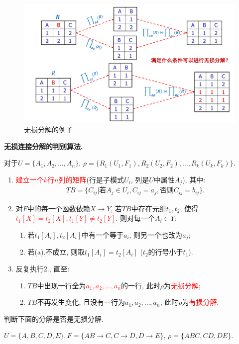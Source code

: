 \begin{figure}[H]
    \centering
    \includegraphics[width=.6\textwidth]{./figure/无损分解.pdf}
    \caption{无损分解的例子}
\end{figure}

\textbf{无损连接分解的判别算法.}

对于$U=\{A_1,A_2,\dots,A_n\}$, $\rho=\{R_1(U_1,F_1),R_2(U_2,F_2),\dots,R_k(U_k,F_k)\}$.
\begin{enumerate}
    \item \textcolor{red}{建立一个$k$行$n$列的矩阵}(行是子模式$U_i$, 列是$U$中属性$A_j$), 其中:
    \begin{align*}
      TB = \{C_{ij} | \text{若}A_j\in U_i, C_{ij}=a_j, \text{否则}C_{ij}=b_{ij}\}.
    \end{align*}
    \item 对$F$中的每一个函数依赖$X\to Y$, 若$TB$中存在元组$t_1,t_2$, 使得\textcolor{red}{$t_1[X]=t_2[X], t_1[Y]\neq t_2[Y]$}. 则对每一个$A_i\in Y$:
    \begin{enumerate}
        \item 若$t_1[A_i],t_2[A_i]$中有一个等于$a_i$, 则另一个也改为$a_j$;
        \item 若(a).不成立, 则取$t_1[A_i]=t_2[A_i]$ ($t_2$的行号小于$t_1$).
    \end{enumerate}
    \item 反复执行2., 直至:
    \begin{enumerate}
        \item $TB$中出现一行全为\textcolor{red}{$a_1,a_2,\dots,a_n$}的一行, 此时$\rho$为\textcolor{red}{无损分解};
        \item $TB$不再发生变化, 且没有一行为$a_1,a_2,\dots,a_n$, 此时$\rho$为\textcolor{red}{有损分解}.
    \end{enumerate}
\end{enumerate}

\begin{example}
  判断下面的分解是否是无损分解.
  
  $U=\{A,B,C,D,E\},F=\{AB\to C,C\to D,D\to E\}$, $\rho = \{ABC,CD,DE\}$.
\end{example}

